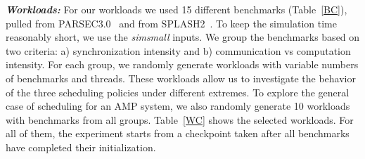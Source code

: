 \begin{table}
{\begin{tabular}{ p{2cm} | p{7cm} | p{4cm} | p{2cm} }
    \hline
  \end{tabular}}
\end{table}

\textbf{\textit{Workloads:}} For our workloads we used 15 different benchmarks (Table~\ref{BC}), pulled from PARSEC3.0~\cite{bienia11benchmarking} and from SPLASH2~\cite{woo1995splash}. To keep the simulation time reasonably short, we use the \emph{simsmall} inputs. We group the benchmarks based on two criteria: a) synchronization intensity and b) communication vs computation intensity. 
For each group, we randomly generate workloads with variable numbers of benchmarks and threads. These workloads allow us to investigate the behavior of the three scheduling policies under different extremes. To explore the general case of scheduling for an AMP system, we also randomly generate 10 workloads with benchmarks from all groups. Table~\ref{WC} shows the selected workloads. For all of them, the experiment starts from a checkpoint taken after all benchmarks have completed their initialization.


